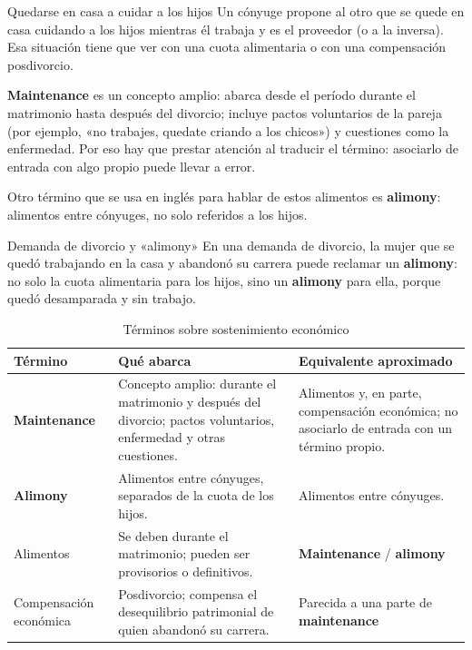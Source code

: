 \documentclass[12pt,oneside]{book}
\begin{document}
\begin{example}{Quedarse en casa a cuidar a los hijos}
Un cónyuge propone al otro que se quede en casa cuidando a los hijos mientras él trabaja y es el proveedor (o a la inversa). Esa situación tiene que ver con una cuota alimentaria o con una compensación posdivorcio.
\end{example}

\textbf{Maintenance} es un concepto amplio: abarca desde el período durante el matrimonio hasta después del divorcio; incluye pactos voluntarios de la pareja (por ejemplo, «no trabajes, quedate criando a los chicos») y cuestiones como la enfermedad. Por eso hay que prestar atención al traducir el término: asociarlo de entrada con algo propio puede llevar a error.

Otro término que se usa en inglés para hablar de estos alimentos es \textbf{alimony}: alimentos entre cónyuges, no solo referidos a los hijos.

\begin{example}{Demanda de divorcio y «alimony»}
En una demanda de divorcio, la mujer que se quedó trabajando en la casa y abandonó su carrera puede reclamar un \textbf{alimony}: no solo la cuota alimentaria para los hijos, sino un \textbf{alimony} para ella, porque quedó desamparada y sin trabajo.
\end{example}

\begin{table}[H]
\centering
\caption{Términos sobre sostenimiento económico}
\begin{tabularx}{\textwidth}{@{}>{\raggedright\arraybackslash}p{}YY@{}}
\toprule
\textbf{Término} & \textbf{Qué abarca} & \textbf{Equivalente aproximado} \\
\midrule
\textbf{Maintenance} & Concepto amplio: durante el matrimonio y después del divorcio; pactos voluntarios, enfermedad y otras cuestiones. & Alimentos y, en parte, compensación económica; no asociarlo de entrada con un término propio. \\
\textbf{Alimony} & Alimentos entre cónyuges, separados de la cuota de los hijos. & Alimentos entre cónyuges. \\
Alimentos & Se deben durante el matrimonio; pueden ser provisorios o definitivos. & \textbf{Maintenance} / \textbf{alimony} \\
Compensación económica & Posdivorcio; compensa el desequilibrio patrimonial de quien abandonó su carrera. & Parecida a una parte de \textbf{maintenance} \\
\bottomrule
\end{tabularx}
\end{table}
\end{document}
